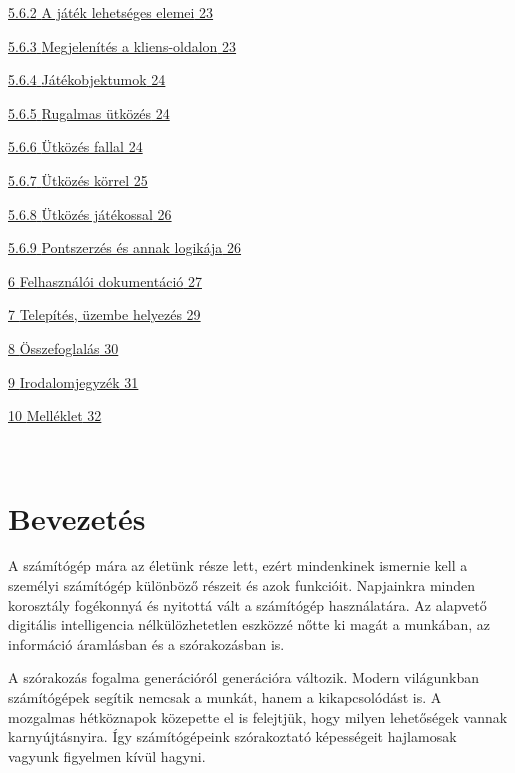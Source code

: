 \documentclass[]{article}
\begin{document}
\protect\hyperlink{a-juxe1tuxe9k-lehetsuxe9ges-elemei}{{5.6.2} {A játék
lehetséges elemei} 23}

\protect\hyperlink{megjelenuxedtuxe9s-a-kliens-oldalon}{{5.6.3}
{Megjelenítés a kliens-oldalon} 23}

\protect\hyperlink{juxe1tuxe9kobjektumok}{{5.6.4} {Játékobjektumok} 24}

\protect\hyperlink{rugalmas-uxfctkuxf6zuxe9s}{{5.6.5} {Rugalmas ütközés}
24}

\protect\hyperlink{uxfctkuxf6zuxe9s-fallal}{{5.6.6} {Ütközés fallal} 24}

\protect\hyperlink{uxfctkuxf6zuxe9s-kuxf6rrel}{{5.6.7} {Ütközés körrel}
25}

\protect\hyperlink{uxfctkuxf6zuxe9s-juxe1tuxe9kossal}{{5.6.8} {Ütközés
játékossal} 26}

\protect\hyperlink{pontszerzuxe9s-uxe9s-annak-logikuxe1ja}{{5.6.9}
{Pontszerzés és annak logikája} 26}

\protect\hyperlink{felhasznuxe1luxf3i-dokumentuxe1ciuxf3}{{6}
{Felhasználói dokumentáció} 27}

\protect\hyperlink{telepuxedtuxe9s-uxfczembe-helyezuxe9s}{{7}
{Telepítés, üzembe helyezés} 29}

\protect\hyperlink{uxf6sszefoglaluxe1s}{{8} {Összefoglalás} 30}

\protect\hyperlink{irodalomjegyzuxe9k}{{9} {Irodalomjegyzék} 31}

\protect\hyperlink{melluxe9klet}{{10} {Melléklet} 32}

\textbf{\\
}

\hypertarget{bevezetuxe9s}{%
\section{Bevezetés}\label{bevezetuxe9s}}

A számítógép mára az életünk része lett, ezért mindenkinek ismernie kell
a személyi számítógép különböző részeit és azok funkcióit. Napjainkra
minden korosztály fogékonnyá és nyitottá vált a számítógép használatára.
Az alapvető digitális intelligencia nélkülözhetetlen eszközzé nőtte ki
magát a munkában, az információ áramlásban és a szórakozásban is.

A szórakozás fogalma generációról generációra változik. Modern
világunkban számítógépek segítik nemcsak a munkát, hanem a
kikapcsolódást is. A mozgalmas hétköznapok közepette el is felejtjük,
hogy milyen lehetőségek vannak karnyújtásnyira. Így számítógépeink
szórakoztató képességeit hajlamosak vagyunk figyelmen kívül hagyni.
\end{document}
